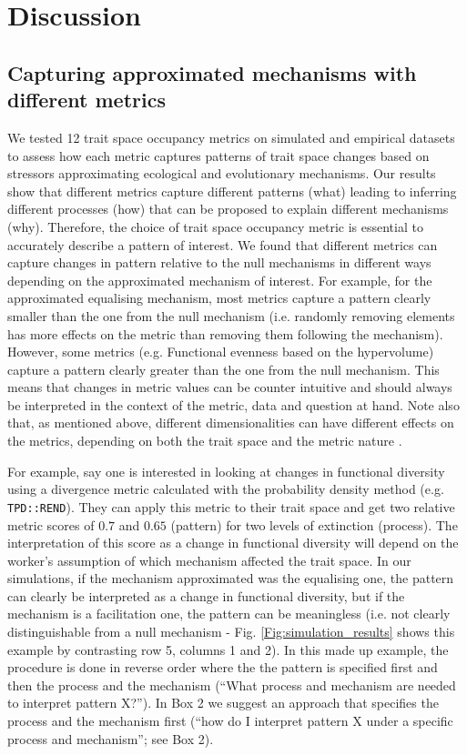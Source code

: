 \documentclass[12pt,letterpaper]{article}
\begin{document}
\section{Discussion}

\subsection{Capturing approximated mechanisms with different metrics}

We tested 12 trait space occupancy metrics on simulated and empirical datasets to assess how each metric captures patterns of trait space changes based on stressors approximating ecological and evolutionary mechanisms.
Our results show that different metrics capture different patterns (what) leading to inferring different processes (how) that can be proposed to explain different mechanisms (why).
Therefore, the choice of trait space occupancy metric is essential to accurately describe a pattern of interest.
We found that different metrics can capture changes in pattern relative to the null mechanisms in different ways depending on the approximated mechanism of interest.
For example, for the approximated equalising mechanism, most metrics capture a pattern clearly smaller than the one from the null mechanism (i.e. randomly removing elements has more effects on the metric than removing them following the mechanism).
However, some metrics (e.g. Functional evenness based on the hypervolume) capture a pattern clearly greater than the one from the null mechanism.
This means that changes in metric values can be counter intuitive and should always be interpreted in the context of the metric, data and question at hand.
Note also that, as mentioned above, different dimensionalities can have different effects on the metrics, depending on both the trait space and the metric nature \citep{bellman1957dynamic}.

For example, say one is interested in looking at changes in functional diversity using a divergence metric calculated with the probability density method (e.g. \texttt{TPD::REND}).
They can apply this metric to their trait space and get two relative metric scores of $0.7$ and $0.65$ (pattern) for two levels of extinction (process).
The interpretation of this score as a change in functional diversity will depend on the worker's assumption of which mechanism affected the trait space.
In our simulations, if the mechanism approximated was the equalising one, the pattern can clearly be interpreted as a change in functional diversity, but if the mechanism is a facilitation one, the pattern can be meaningless (i.e. not clearly distinguishable from a null mechanism - Fig. \ref{Fig:simulation_results} shows this example by contrasting row 5, columns 1 and 2).
In this made up example, the procedure is done in reverse order where the the pattern is specified first and then the process and the mechanism (``What process and mechanism are needed to interpret pattern X?'').
In Box 2 we suggest an approach that specifies the process and the mechanism first (``how do I interpret pattern X under a specific process and mechanism''; see Box 2).
\end{document}
